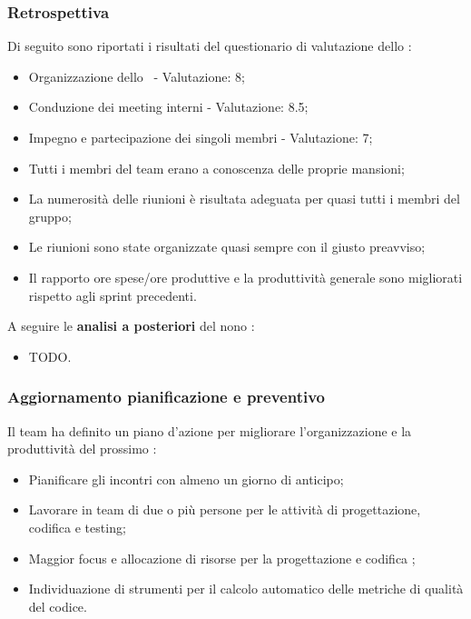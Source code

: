 \subsubsection{Retrospettiva}

\par Di seguito sono riportati i risultati del questionario di valutazione dello :
\begin{itemize}
  \item Organizzazione dello \ - Valutazione: 8;
  \item Conduzione dei meeting interni - Valutazione: 8.5;
  \item Impegno e partecipazione dei singoli membri - Valutazione: 7;
  \item Tutti i membri del team erano a conoscenza delle proprie mansioni;
  \item La numerosità delle riunioni è risultata adeguata per quasi tutti i membri del gruppo;
  \item Le riunioni sono state organizzate quasi sempre con il giusto preavviso;
  \item Il rapporto ore spese/ore produttive e la produttività generale sono migliorati rispetto agli sprint precedenti.
\end{itemize}

\vspace{0.5\baselineskip}
\par A seguire le \textbf{analisi a posteriori} del nono :
\begin{itemize}
  \item TODO.
\end{itemize}

\subsubsection{Aggiornamento pianificazione e preventivo}
\par Il team ha definito un piano d'azione per migliorare l'organizzazione e la produttività del prossimo :
\begin{itemize}
  \item Pianificare gli incontri con almeno un giorno di anticipo;
  \item Lavorare in team di due o più persone per le attività di progettazione, codifica e testing;
  \item Maggior focus e allocazione di risorse per la progettazione e codifica ;
  \item Individuazione di strumenti per il calcolo automatico delle metriche di qualità del codice.
\end{itemize}

